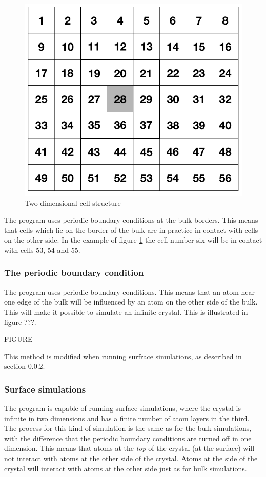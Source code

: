 \documentclass[12pt,a4paper]{article}
\begin{document}
\begin{figure}[h]
\begin{center}
\includegraphics[scale=0.4]{figs/cells.png}
\caption{\small Two-dimensional cell structure
\label{fig:cells}}
\end{center}
\end{figure}

The program uses periodic boundary conditions at the bulk borders. This means that cells which lie on the border of the bulk are in practice in contact with cells on the other side. In the example of figure \ref{fig:cells} the cell number six will be in contact with cells 53, 54 and 55. 


\subsubsection{The periodic boundary condition}
\label{sec:the_periodic_boundary_condition}
The program uses periodic boundary conditions. This means that an atom near one edge of the bulk will be influenced by an atom on the other side of the bulk. This will make it possible to simulate an infinite crystal. This is illustrated in figure ???.

FIGURE

This method is modified when running surfrace simulations, as described in section \ref{sec:surface_simulations}.


\subsubsection{Surface simulations}
\label{sec:surface_simulations}
The program is capable of running surface simulations, where the crystal is infinite in two dimensions and has a finite number of atom layers in the third. The process for this kind of simulation is the same as for the bulk simulations, with the difference that the periodic boundary conditions are turned off in one dimension. This means that atoms at the \emph{top} of the crystal (at the surface) will not interact with atoms at the other side of the crystal. Atoms at the side of the crystal will interact with atoms at the other side just as for bulk simulations. 
\end{document}
